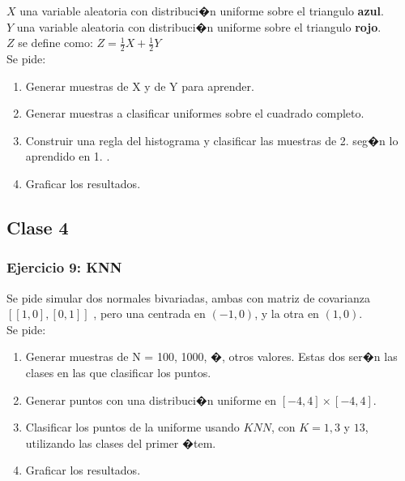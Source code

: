 \documentclass[a4paper,10pt]{article}
\begin{document}
	$X$ una variable aleatoria con distribuci�n uniforme sobre el triangulo \textbf{azul}.\\
	
	$Y$ una variable aleatoria con distribuci�n uniforme sobre el triangulo \textbf{rojo}.\\
	
	$Z$ se define como: 	
	 $Z = \frac{1}{2}X + \frac{1}{2}Y$\\
	 
	Se pide:
	 
	\begin{enumerate}
	
	\item	Generar muestras de X y de Y para aprender.
	
	\item	Generar muestras a clasificar uniformes sobre el cuadrado completo.
	
	\item	Construir una regla del histograma y clasificar las muestras de 2. seg�n lo aprendido en 1. .
	
	\item	Graficar los resultados.
	
	\end{enumerate}

	\subsection{Clase 4}
				
	\subsubsection{Ejercicio 9: KNN}
	
	
	Se pide simular dos normales bivariadas, ambas con matriz de covarianza $\left[ \left[ 1 , 0 \right] , \left[ 0,1\right] \right]$	
	, pero una centrada en $(-1, 0)$, y la otra en $(1, 0)$.\\
	
	Se pide:
	\begin{enumerate}
	
		\item	Generar muestras de N = 100, 1000, �, otros valores. Estas dos ser�n las clases en las que clasificar los puntos.
		
		\item 
		Generar puntos con una distribuci�n uniforme en $\left[-4, 4\right] \times \left[-4, 4\right]$.
		
		\item Clasificar los puntos de la uniforme usando $KNN$, con $K = 1, 3$ y $13$, utilizando las clases del primer �tem.
		
		\item Graficar los resultados.
	\end{enumerate}
\end{document}
